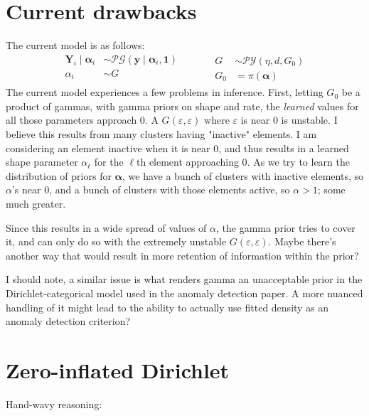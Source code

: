 \documentclass{article}
\begin{document}
\section*{Current drawbacks}
The current model is as follows:
\[
\begin{aligned}
\bm{Y}_i\mid\bm{\alpha}_i &\sim \mathcal{PG}(\bm{y}\mid\bm{\alpha}_i, \bm{1})\\
\alpha_i &\sim G\\
\end{aligned}
\;\hspace{1cm}\;
\begin{aligned}
G &\sim \mathcal{PY}(\eta, d, G_0)\\
G_0 &= \pi(\bm{\alpha})
\end{aligned}
\]
The current model experiences a few problems in inference.  First, letting $G_0$
    be a product of gammas, with gamma priors on shape and rate, the 
    \emph{learned} values for all those parameters approach 0.  A 
    $G(\varepsilon,\varepsilon)$ where $\varepsilon$ is near 0 is unstable.  I 
    believe this results from many clusters having "inactive" elements.  I am 
    considering an element inactive when it is near 0, and thus results in a 
    learned shape parameter $\alpha_{\ell}$ for the $\ell$th element approaching 
    0.  As we try to learn the distribution of priors for $\bm{\alpha}$, we have 
    a bunch of clusters with inactive elements, so $\alpha$'s near 0, and a 
    bunch of clusters with those elements active, so $\alpha > 1$; some much 
    greater.

Since this results in a wide spread of values of $\alpha$, the gamma prior tries 
    to cover it, and can only do so with the extremely unstable 
    $G(\varepsilon,\varepsilon)$.  Maybe there's another way that would result 
    in more retention of information within the prior?

I should note, a similar issue is what renders gamma an unacceptable prior in 
    the Dirichlet-categorical model used in the anomaly detection paper.  A more 
    nuanced handling of it might lead to the ability to actually use fitted 
    density as an anomaly detection criterion?


\section*{Zero-inflated Dirichlet}
Hand-wavy reasoning:
\end{document}
